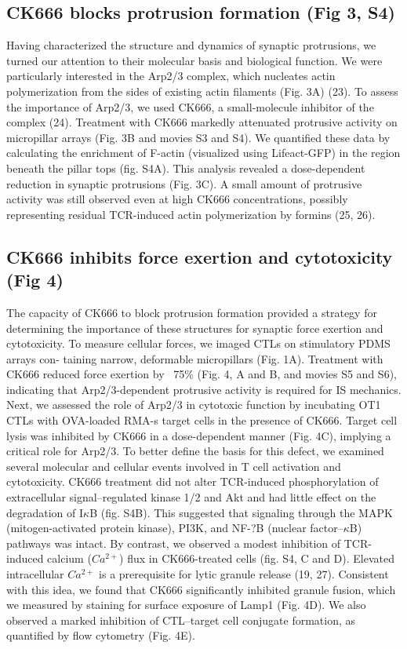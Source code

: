 \subsection{CK666 blocks protrusion formation (Fig 3, S4)}

Having characterized the structure and dynamics of synaptic protrusions, we turned our attention to their molecular basis and biological function. We were particularly interested in the Arp2/3 complex, which nucleates actin polymerization from the sides of existing actin filaments (Fig. 3A) (23). To assess the importance of Arp2/3, we used CK666, a small-molecule inhibitor of the complex (24). Treatment with CK666 markedly attenuated protrusive activity on micropillar arrays (Fig. 3B and movies S3 and S4). We quantified these data by calculating the enrichment of F-actin (visualized using Lifeact-GFP) in the region beneath the pillar tops (fig. S4A). This analysis revealed a dose-dependent reduction in synaptic protrusions (Fig. 3C). A small amount of protrusive activity was still observed even at high CK666 concentrations, possibly representing residual TCR-induced actin polymerization by formins (25, 26).

\subsection{CK666 inhibits force exertion and cytotoxicity (Fig 4)}

The capacity of CK666 to block protrusion formation provided a strategy for determining the importance of these structures for synaptic force exertion and cytotoxicity. To measure cellular forces, we imaged CTLs on stimulatory PDMS arrays con- taining narrow, deformable micropillars (Fig. 1A). Treatment with CK666 reduced force exertion by ~75\% (Fig. 4, A and B, and movies S5 and S6), indicating that Arp2/3-dependent protrusive activity is required for IS mechanics. Next, we assessed the role of Arp2/3 in cytotoxic function by incubating OT1 CTLs with OVA-loaded RMA-s target cells in the presence of CK666. Target cell lysis was inhibited by CK666 in a dose-dependent manner (Fig. 4C), implying a critical role for Arp2/3. To better define the basis for this defect, we examined several molecular and cellular events involved in T cell activation and cytotoxicity. CK666 treatment did not alter TCR-induced phosphorylation of extracellular signal–regulated kinase 1/2 and Akt and had little effect on the degradation of I$\kappa$B (fig. S4B). This suggested that signaling through the MAPK (mitogen-activated protein kinase), PI3K, and NF-?B (nuclear factor–$\kappa$B) pathways was intact. By contrast, we observed a modest inhibition of TCR-induced calcium ($Ca^{2+}$) flux in CK666-treated cells (fig. S4, C and D). Elevated intracellular $Ca^{2+}$ is a prerequisite for lytic granule release (19, 27). Consistent with this idea, we found that CK666 significantly inhibited granule fusion, which we measured by staining for surface exposure of Lamp1 (Fig. 4D). We also observed a marked inhibition of CTL–target cell conjugate formation, as quantified by flow cytometry (Fig. 4E).

